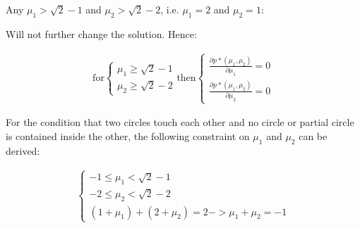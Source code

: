 \documentclass[11pt, letterpaper, titlepage]{article}
\begin{document}
\begin{enumerate}
\begin{enumerate}
        Any $\mu_1 > \sqrt{2} - 1$ and $\mu_2 > \sqrt{2} - 2$, i.e. $\mu_1 = 2$ and $\mu_2 = 1$:
        
        \begin{center}
        \def\circlee{(1, 1) circle (3)}
        \def\circlef{(1, -1) circle (3)}
        \end{center}
        
        Will not further change the solution. Hence:
        
        \begin{gather*}
        \text{for}
            \begin{cases}
                \mu_1 \geq \sqrt{2} - 1 \\
                \mu_2 \geq \sqrt{2} - 2
            \end{cases}
            \text{then}
            \begin{cases}
                \frac{\partial p*(\mu_1, \mu_2)}{\partial \mu_1} = 0 \\
                \frac{\partial p*(\mu_1, \mu_2)}{\partial \mu_2} = 0
            \end{cases}
        \end{gather*}
        
        For the condition that two circles touch each other and no circle or partial circle is contained inside the other, the following constraint on $\mu_1$ and $\mu_2$ can be derived: 
        
        \begin{gather*}
            \begin{cases}
                - 1 \leq \mu_1 < \sqrt{2} - 1 \\
                - 2 \leq \mu_2 < \sqrt{2} - 2 \\
                (1 + \mu_1) + (2 + \mu_2) = 2 -> \mu_1 + \mu_2 = -1
            \end{cases}
        \end{gather*}
        

\end{enumerate}
\end{enumerate}
\end{document}
